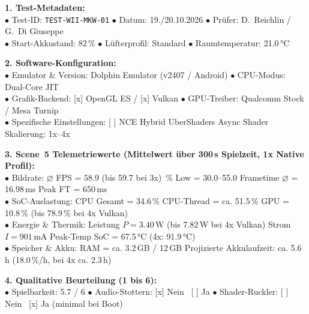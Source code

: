 \documentclass[12pt,a4paper]{scrartcl}
\begin{document}
\begin{tcolorbox}[colback=boxBg, colframe=boxBorder, arc=2mm, title={\textbf{Messprotokoll 2: Nintendo Wii -- Mario Kart Wii}}]
    \small
    \textbf{1. Test-Metadaten:}\\
    $\bullet$ Test-ID: \texttt{TEST-WII-MKW-01} \quad $\bullet$ Datum: 19./20.10.2026 \quad $\bullet$ Prüfer: D.~Reichlin / G.~Di Giuseppe\\
    $\bullet$ Start-Akkustand: 82\,\% \quad $\bullet$ Lüfterprofil: Standard \quad $\bullet$ Raumtemperatur: 21.0\,°C

    \medskip
    \textbf{2. Software-Konfiguration:}\\
    $\bullet$ Emulator \& Version: Dolphin Emulator (v2407 / Android) \quad $\bullet$ CPU-Modus: Dual-Core JIT\\
    $\bullet$ Grafik-Backend: [x] OpenGL ES / [x] Vulkan \qquad $\bullet$ GPU-Treiber: Qualcomm Stock / Mesa Turnip\\
    $\bullet$ Spezifische Einstellungen: [ ] NCE \quad [x] Hybrid UberShaders \quad [x] Async Shader \quad Skalierung: 1x--4x

    \medskip
    \textbf{3. Scene~5 Telemetriewerte (Mittelwert über 300\,s Spielzeit, 1x Native Profil):}\\
    $\bullet$ Bildrate: $\varnothing$ FPS = 58.9 (bis 59.7 bei 3x) \,\% Low = 30.0--55.0 \quad Frametime $\varnothing$ = 16.98\,ms \quad Peak FT = 650\,ms\\
    $\bullet$ SoC-Auslastung: CPU Gesamt = 34.6\,\% \quad CPU-Thread = ca. 51.5\,\% \quad GPU = 10.8\,\% (bis 78.9\,\% bei 4x Vulkan)\\
    $\bullet$ Energie \& Thermik: Leistung $P = 3.40$\,W (bis 7.82\,W bei 4x Vulkan) \quad Strom $I = 901$\,mA \quad Peak-Temp SoC = 67.5\,°C (4x: 91.9\,°C)\\
    $\bullet$ Speicher \& Akku: RAM = ca. 3.2\,GB / 12\,GB \quad Projizierte Akkulaufzeit: ca. 5.6\,h (18.0\,\%/h, bei 4x ca. 2.3\,h)

    \medskip
    \textbf{4. Qualitative Beurteilung (1 bis 6):}\\
    $\bullet$ Spielbarkeit: 5.7 / 6 \quad $\bullet$ Audio-Stottern: [x] Nein \ [ ] Ja \quad $\bullet$ Shader-Ruckler: [ ] Nein \ [x] Ja (minimal bei Boot)
\end{tcolorbox}
\end{document}
